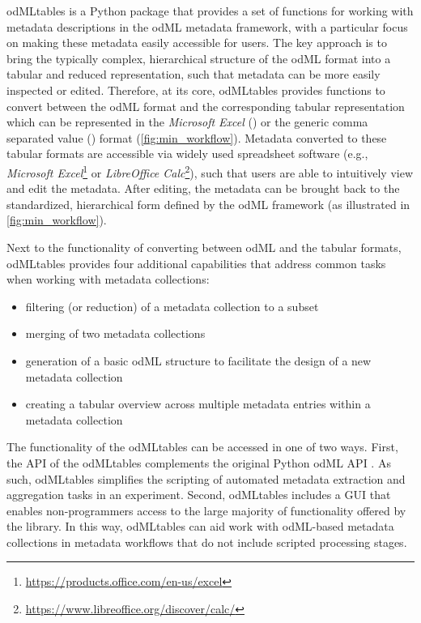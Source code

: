 {odMLtables is a Python package that provides a set of functions for working with metadata descriptions in the odML metadata framework, with a particular focus on making these metadata easily accessible for users. The key approach is to bring the typically complex, hierarchical structure of the odML format into a tabular and reduced  representation, such that metadata can be more easily inspected or edited. Therefore, at its core, odMLtables provides functions to convert between the odML format and the corresponding tabular representation which can be represented in the \textit{Microsoft Excel} () or the generic comma separated value () format (\cref{fig:min_workflow}). Metadata converted to these tabular formats are accessible via widely used spreadsheet software (e.g., \textit{Microsoft Excel}\footnote{\url{https://products.office.com/en-us/excel}} or \textit{LibreOffice Calc}\footnote{\url{https://www.libreoffice.org/discover/calc/}}), such that users are able to intuitively view and edit the metadata. After editing, the metadata can be brought back to the standardized, hierarchical form defined by the odML framework (as illustrated in \cref{fig:min_workflow}).

Next to the functionality of converting between odML and the tabular formats, odMLtables provides four additional capabilities that address common tasks when working with metadata collections:
\begin{itemize}
    \item filtering (or reduction) of a metadata collection to a subset
    \item merging of two metadata collections
    \item generation of a basic odML structure to facilitate the design of a new metadata collection
    \item creating a tabular overview across multiple metadata entries within a metadata collection
\end{itemize}

The functionality of the odMLtables can be accessed in one of two ways. First, the API of the odMLtables complements the original Python odML API \citep{Grewe_2011}. As such, odMLtables simplifies the scripting of automated metadata extraction and aggregation tasks in an experiment. Second, odMLtables includes a GUI that enables non-programmers access to the large majority of functionality offered by the library. In this way, odMLtables can aid work with odML-based metadata collections in metadata workflows that do not include scripted processing stages.

}
